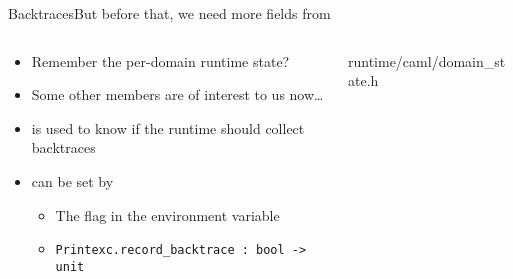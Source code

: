 \begin{frame}{Backtraces}{But before that, we need more fields from }
  \begin{columns}
    \begin{column}{0.5\textwidth}
      \begin{itemize}
        \item Remember  the per-domain runtime state?
        \item Some other members are of interest to us now\dots
        \item {} is used to know if the runtime should collect backtraces
        \item {} can be set by
          \begin{itemize}
            \item The  flag in the  environment variable
            \item \texttt{Printexc.record_backtrace : bool -> unit} \footnotemark
          \end{itemize}
      \end{itemize}
    \end{column}
    \begin{column}{0.5\textwidth}
      \begin{listing}
        \caption{runtime/caml/domain\_state.h}
      \end{listing}
    \end{column}
  \end{columns}
\end{frame}

\newcommand\listCamlRaiseExn[1][]{
  \listasm[firstline=702,lastline=725,#1]{../ocaml/runtime/amd64.S}{runtime/amd64.S:702}}

